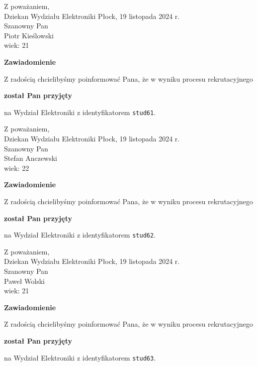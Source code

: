 \documentclass[12pt,a4paper]{article}
\begin{document}
\noindent
Z poważaniem,\\
Dziekan
Wydziału Elektroniki
\newpage
\hfill Płock, 19 listopada 2024 r.\\ 
\noindent 
Szanowny Pan \\
Piotr Kieślowski \\
wiek: 21

\bigskip

\begin{center}
{\Large\textbf{Zawiadomienie}}
\end{center}
\bigskip
Z radością chcielibyśmy poinformować Pana, że w wyniku procesu rekrutacyjnego
\begin{center}
\textsf{\textbf{został Pan przyjęty}} 
\end{center}
na Wydział Elektroniki z identyfikatorem \verb|stud61|.
\vspace{2cm}

\noindent
Z poważaniem,\\
Dziekan
Wydziału Elektroniki
\newpage
\hfill Płock, 19 listopada 2024 r.\\ 
\noindent 
Szanowny Pan \\
Stefan Anczewski \\
wiek: 22

\bigskip

\begin{center}
{\Large\textbf{Zawiadomienie}}
\end{center}
\bigskip
Z radością chcielibyśmy poinformować Pana, że w wyniku procesu rekrutacyjnego
\begin{center}
\textsf{\textbf{został Pan przyjęty}} 
\end{center}
na Wydział Elektroniki z identyfikatorem \verb|stud62|.
\vspace{2cm}

\noindent
Z poważaniem,\\
Dziekan
Wydziału Elektroniki
\newpage
\hfill Płock, 19 listopada 2024 r.\\ 
\noindent 
Szanowny Pan \\
Paweł Wolski \\
wiek: 21

\bigskip

\begin{center}
{\Large\textbf{Zawiadomienie}}
\end{center}
\bigskip
Z radością chcielibyśmy poinformować Pana, że w wyniku procesu rekrutacyjnego
\begin{center}
\textsf{\textbf{został Pan przyjęty}} 
\end{center}
na Wydział Elektroniki z identyfikatorem \verb|stud63|.
\vspace{2cm}
\end{document}
